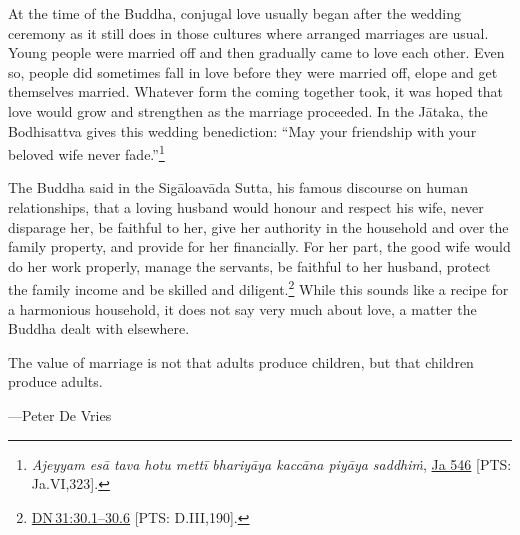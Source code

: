 \documentclass[10pt, openright]{book}
\newenvironment{epigram-2}%
{%
\setstretch{1.4}
\vspace{1em}
\noindent
\quoting[leftmargin=2cm,rightmargin=2cm]%
\begin{itshape}
\large
}%
{\end{itshape}\endquoting
}%
\newenvironment{epigram-2-cite}%
{%
\quoting[leftmargin=2cm,rightmargin=2cm]%
\noindent\normal\hspace*{\fill} 
}%
{\endquoting
}%
\begin{document}
At the time of the Buddha, conjugal love usually began after the wedding ceremony as it still does in those cultures where arranged marriages are usual. Young people were married off and then gradually came to love each other. Even so, people did sometimes fall in love before they were married off, elope and get themselves married. Whatever form the coming together took, it was hoped that love would grow and strengthen as the marriage proceeded. In the Jātaka, the Bodhisattva gives this wedding benediction: “May your friendship with your beloved wife never fade.”\footnote {\textit{Ajeyyam esā tava hotu mettī bhariyāya kaccāna piyāya saddhiṁ}, \href{https://suttacentral.net/ja546/en/cowell-rouse?reference=main/pts#pts-vp-pli323}{Ja 546} [PTS: Ja.VI,323].}


The Buddha said in the Sigāloavāda Sutta, his famous discourse on human relationships, that a loving husband would honour and respect his wife, never disparage her, be faithful to her, give her authority in the household and over the family property, and provide for her financially. For her part, the good wife would do her work properly, manage the servants, be faithful to her husband, protect the family income and be skilled and diligent.\footnote {\href{https://suttacentral.net/dn31/en/sujato\#30.1}{DN 31:30.1–30.6} [PTS: D.III,190].} While this sounds like a recipe for a harmonious household, it does not say very much about love, a matter the Buddha dealt with elsewhere.


\begin{epigram-2}
The value of marriage is not that adults produce children, but that children produce adults.
\end{epigram-2}
\begin{epigram-2-cite}
—Peter De Vries
\end{epigram-2-cite}
\end{document}
